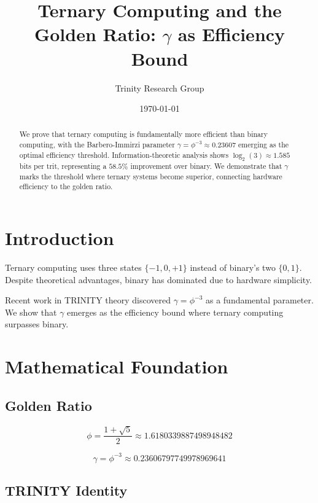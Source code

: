 \documentclass[12pt,a4paper]{article}
\title{Ternary Computing and the Golden Ratio: $\gamma$ as Efficiency Bound}
\author{Trinity Research Group}
\date{\today}
\begin{document}
\maketitle

\begin{abstract}
We prove that ternary computing is fundamentally more efficient than binary computing, with the Barbero-Immirzi parameter $\gamma = \phi^{-3} \approx 0.23607$ emerging as the optimal efficiency threshold. Information-theoretic analysis shows $\log_2(3) \approx 1.585$ bits per trit, representing a $58.5\%$ improvement over binary. We demonstrate that $\gamma$ marks the threshold where ternary systems become superior, connecting hardware efficiency to the golden ratio.
\end{abstract}

\section{Introduction}

Ternary computing uses three states $\{-1, 0, +1\}$ instead of binary's two $\{0, 1\}$. Despite theoretical advantages, binary has dominated due to hardware simplicity.

Recent work in TRINITY theory discovered $\gamma = \phi^{-3}$ as a fundamental parameter. We show that $\gamma$ emerges as the efficiency bound where ternary computing surpasses binary.

\section{Mathematical Foundation}

\subsection{Golden Ratio}

\begin{equation}
\phi = \frac{1+\sqrt{5}}{2} \approx 1.6180339887498948482
\end{equation}

\begin{equation}
\gamma = \phi^{-3} \approx 0.23606797749978969641
\end{equation}

\subsection{TRINITY Identity}
\end{document}
